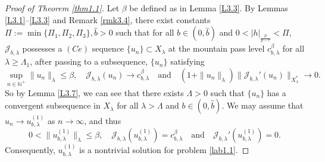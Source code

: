 \documentclass[reqno]{amsart}
\begin{document}
\begin{proof}[Proof of Theorem \ref{thm1.1}]
Let $\beta$ be defined as in Lemma \ref{L3.3}. By Lemmas \ref{L3.1}--\ref{L3.3} 
and Remark \ref{rmk3.4}, there exist constants 
$\Pi:=\min\{\Pi_1,\Pi_2,\Pi_3\}, \widehat{b}>0$ such that for all $b\in(0, \widehat{b})$ 
and $0<|h|_{\frac{p}{p-r}}<\Pi$, $\mathcal{J}_{b,\lambda}$ possesses a $(Ce)$ sequence 
$\{u_n\}\subset X_\lambda$ at the
mountain pass level $c_{b,\lambda}^\beta$ for all $\lambda\geq\Lambda_1$, 
after passing to a subsequence, $\{u_n\}$ satisfying
$$
\sup_{n\in\mathbb{N}^+}\|u_n\|_\lambda\leq\beta,\quad
 \mathcal{J}_{b,\lambda}(u_n)\to  c_{b,\lambda}^\beta\quad \text{and}\quad
 (1+\|u_n\|_\lambda)\|\mathcal{J}_{b,\lambda}'(u_n)\|_{X_\lambda^*}\to  0.
$$
So by Lemma \ref{L3.7}, we can see that there exists $\Lambda>0$ such that 
$\{u_n\}$ has a convergent subsequence in $X_\lambda$ for all 
$\lambda>\Lambda$ and $b\in(0, \widehat{b})$. We may assume that 
$u_n\to  u_{b,\lambda}^{(1)}$ as $n\to \infty$, and thus
$$
0<\|u_{b,\lambda}^{(1)}\|_\lambda\leq\beta,\quad
\mathcal{J}_{b,\lambda}(u_{b,\lambda}^{(1)})= c_{b,\lambda}^\beta\quad \text{and}\quad
\mathcal{J}_{b,\lambda}'(u_{b,\lambda}^{(1)})=0.
$$
Consequently, $u_{b,\lambda}^{(1)}$ is a nontrivial solution for problem \eqref{lab1.1}.


\end{proof}
\end{document}
